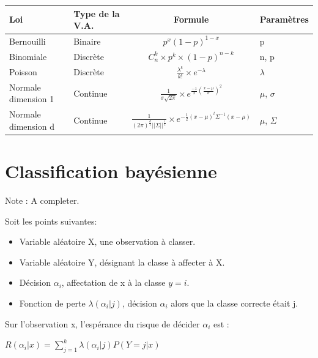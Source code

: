\documentclass{article}
\begin{document}
\begin{tabular}{|l|l|c|l|}
  \hline
  Loi & Type de la V.A. & Formule & Paramètres \\
  \hline
  Bernouilli & Binaire & $p^x(1-p)^{1-x}$ & p \\
  Binomiale & Discrète & $C^{k}_{n} \times p^k \times (1-p)^{n-k}$ & n, p \\
  Poisson &Discrète & $\frac{\lambda^k}{k!} \times e^{- \lambda} $ & $\lambda$ \\
  Normale dimension 1 & Continue & $\frac{1}{\sigma \sqrt{2 \pi}} \times e^{\frac{-1}{2}(\frac{x - \mu}{\sigma})^2} $ & $\mu$, $\sigma$ \\
  Normale dimension d & Continue& $\frac{1}{(2 \pi)^{\frac{d}{2}} ||\Sigma||^{\frac{1}{2}}} \times e^{- \frac{1}{2} (x - \mu)^t \Sigma^{-1} (x - \mu)}$ & $\mu$, $\Sigma$ \\ 
  \hline
\end{tabular}


\section{Classification bayésienne}

Note : A completer.

Soit les points suivantes:

\begin{itemize}
\item Variable aléatoire X, une observation à classer.
\item Variable aléatoire Y, désignant la classe à affecter à X.
\item Décision $\alpha_i$, affectation de x à la classe $y = i$.
\item Fonction de perte $\lambda(\alpha_i | j)$, décision $\alpha_i$ alors que la classe correcte était j.
\end{itemize}

Sur l'observation x, l'espérance du risque de décider $\alpha_i$ est : 

$ R(\alpha_i | x) = \sum_{j = 1}^{k} \lambda(\alpha_i | j) P(Y = j | x) $
\end{document}

